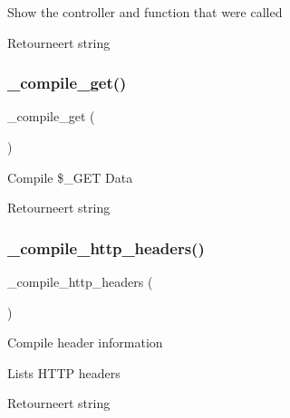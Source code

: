 Show the controller and function that were called

\begin{DoxyReturn}{Retourneert}
string 
\end{DoxyReturn}
\mbox{\label{class_c_i___profiler_a94ef351d1234fe87ee3f5cd7c855f8a5}} 
\subsubsection{\texorpdfstring{\_compile\_get()}{\_compile\_get()}}
{\footnotesize\ttfamily \+\_\+compile\+\_\+get (\begin{DoxyParamCaption}{ }\end{DoxyParamCaption})\hspace{0.3cm}{\ttfamily [protected]}}

Compile \$\+\_\+\+G\+ET Data

\begin{DoxyReturn}{Retourneert}
string 
\end{DoxyReturn}
\mbox{\label{class_c_i___profiler_a80a22812f0243b3daaf78e3614bddadb}} 
\subsubsection{\texorpdfstring{\_compile\_http\_headers()}{\_compile\_http\_headers()}}
{\footnotesize\ttfamily \+\_\+compile\+\_\+http\+\_\+headers (\begin{DoxyParamCaption}{ }\end{DoxyParamCaption})\hspace{0.3cm}{\ttfamily [protected]}}

Compile header information

Lists H\+T\+TP headers

\begin{DoxyReturn}{Retourneert}
string 
\end{DoxyReturn}
\mbox{\label{class_c_i___profiler_a409e57ba71d0463bb684925e2c6a5658}} 
